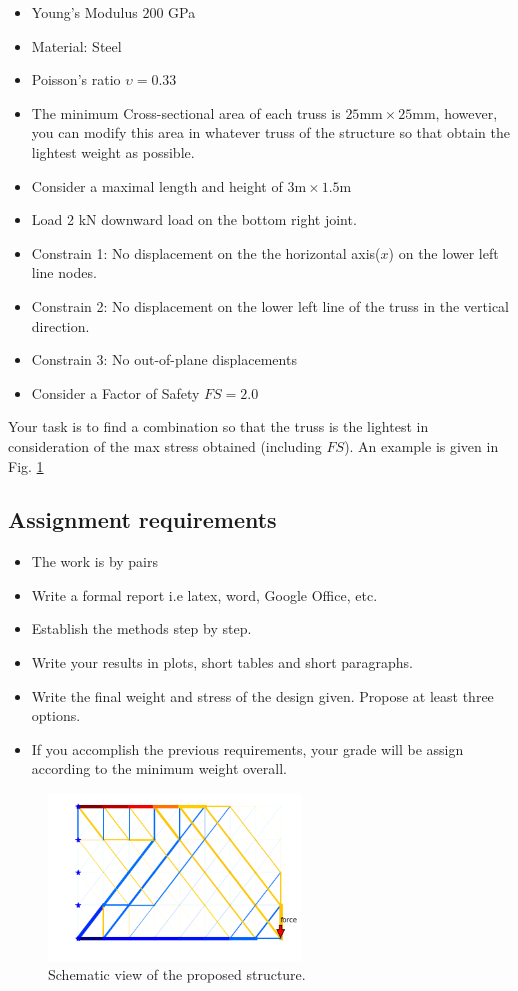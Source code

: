 \documentclass[letterpaper,pdftex]{article}
\begin{document}
\begin{itemize}
\item Young's Modulus $200$ \si{\GPa}
\item Material: Steel
\item Poisson's ratio $\upsilon = 0.33$
\item The minimum Cross-sectional area of each truss is $25 \si{\mm} \times 25 \si{\mm}$, however, you can modify this area in whatever truss of the structure so that obtain the lightest weight as possible.
\item Consider a maximal length and height of $3\si{\m} \times 1.5\si{\m}$   
\item Load 2 \si{\kN} downward load on the bottom right joint.
\item Constrain 1: No displacement on the the horizontal axis($x$) on the lower left line nodes.
\item Constrain 2: No displacement on the lower left line of the truss in the vertical direction.
\item Constrain 3: No out-of-plane displacements
\item Consider a Factor of Safety $FS=2.0$
\end{itemize}

Your task is to find a combination so that the truss is the lightest in consideration of the max stress obtained (including $FS$). An example is given in Fig. \ref{fig:opt_struc}


\subsection{Assignment requirements}

\begin{itemize}
\item The work is by pairs
\item Write a formal report i.e latex, word, Google Office, etc.
\item Establish the methods step by step.
\item Write your results in plots, short tables and short paragraphs.
\item Write the final weight and stress of the design given. Propose at least three options.
\item If you accomplish the previous requirements, your grade will be assign according to the minimum weight overall.
\end{itemize}


\begin{figure}[h]
   \centering
   \includegraphics[width=0.6\textwidth]{output_22_3}
   \caption{Schematic view of the proposed structure.}
   \label{fig:opt_struc}
\end{figure}
\end{document}
